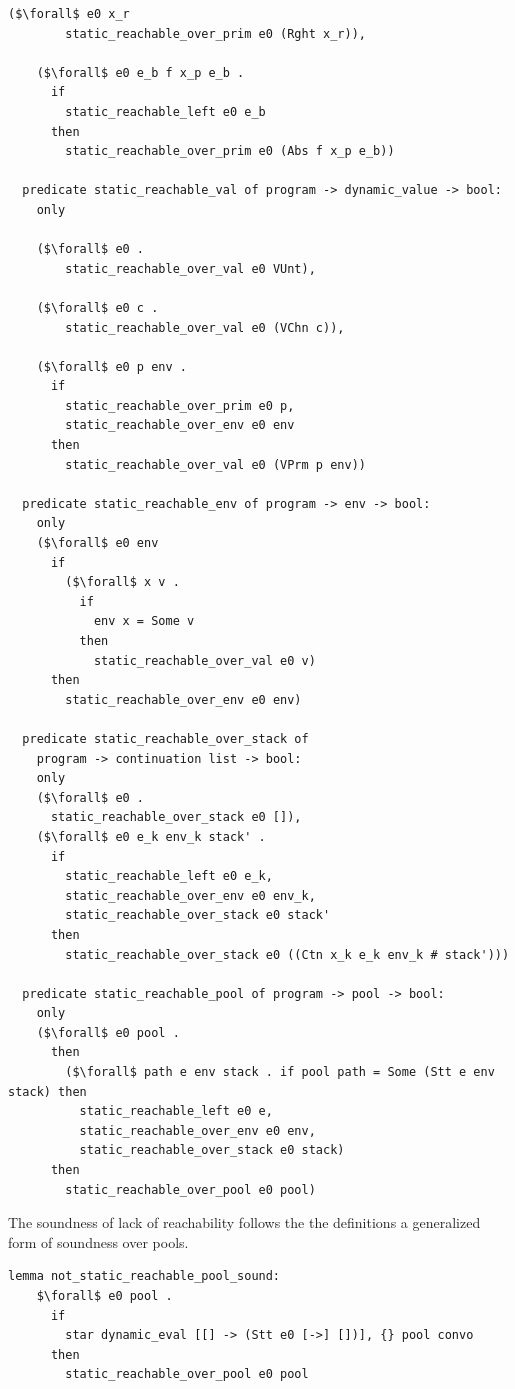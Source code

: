 \documentclass{article}
\begin{document}
\begin{lstlisting}[language=logic, mathescape]
    ($\forall$ e0 x_r
        static_reachable_over_prim e0 (Rght x_r)),

    ($\forall$ e0 e_b f x_p e_b . 
      if
        static_reachable_left e0 e_b 
      then
        static_reachable_over_prim e0 (Abs f x_p e_b))

  predicate static_reachable_val of program -> dynamic_value -> bool:
    only

    ($\forall$ e0 .
        static_reachable_over_val e0 VUnt),

    ($\forall$ e0 c .
        static_reachable_over_val e0 (VChn c)),

    ($\forall$ e0 p env .
      if
        static_reachable_over_prim e0 p, 
        static_reachable_over_env e0 env
      then
        static_reachable_over_val e0 (VPrm p env))

  predicate static_reachable_env of program -> env -> bool:
    only
    ($\forall$ e0 env
      if
        ($\forall$ x v .
          if
            env x = Some v
          then
            static_reachable_over_val e0 v)
      then
        static_reachable_over_env e0 env)

  predicate static_reachable_over_stack of
    program -> continuation list -> bool:
    only
    ($\forall$ e0 .
      static_reachable_over_stack e0 []),
    ($\forall$ e0 e_k env_k stack' .
      if
        static_reachable_left e0 e_k, 
        static_reachable_over_env e0 env_k,
        static_reachable_over_stack e0 stack' 
      then
        static_reachable_over_stack e0 ((Ctn x_k e_k env_k # stack')))

  predicate static_reachable_pool of program -> pool -> bool:
    only
    ($\forall$ e0 pool .
      then
        ($\forall$ path e env stack . if pool path = Some (Stt e env stack) then 
          static_reachable_left e0 e, 
          static_reachable_over_env e0 env, 
          static_reachable_over_stack e0 stack)
      then
        static_reachable_over_pool e0 pool)

  \end{lstlisting}

The soundness of lack of reachability follows the the definitions
a generalized form of soundness over pools.

\begin{lstlisting}[language=logic, mathescape]
  lemma not_static_reachable_pool_sound:
    $\forall$ e0 pool .
      if
        star dynamic_eval [[] -> (Stt e0 [->] [])], {} pool convo 
      then
        static_reachable_over_pool e0 pool

  \end{lstlisting}
\end{document}
